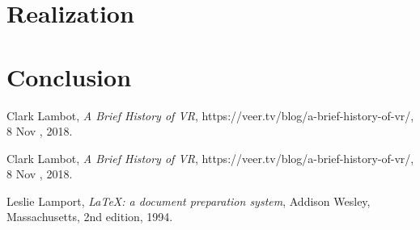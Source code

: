 \documentclass[]{report}
\begin{document}
\section{Realization}

\section{Conclusion}




\begin{thebibliography}{9}
	
	Clark Lambot,
	\textit{A Brief History of VR},
	https://veer.tv/blog/a-brief-history-of-vr/,
	8 Nov , 2018.
	
	Clark Lambot,
	\textit{A Brief History of VR},
	https://veer.tv/blog/a-brief-history-of-vr/,
	8 Nov , 2018.
	
	Leslie Lamport,
	\textit{\LaTeX: a document preparation system},
	Addison Wesley, Massachusetts,
	2nd edition,
	1994.
	
\end{thebibliography}
\end{document}
